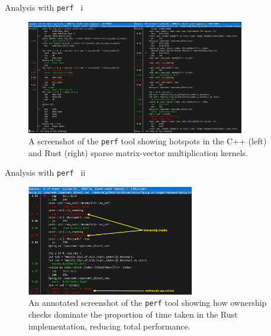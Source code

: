 \documentclass[10pt,aspectratio=169]{beamer}
\begin{document}
\begin{frame}{Analysis with \texttt{perf} \ i}
    \begin{figure}[H]
        \includegraphics[width=0.85\textwidth]{images/perf_annot_cmp.png}
        \caption{A screenshot of the \texttt{perf} tool showing hotspots in the C++ (left) and Rust (right) sparse matrix-vector multiplication kernels.}
        \label{fig:perfAnnotCmp}
    \end{figure}
\end{frame}

\begin{frame}{Analysis with \texttt{perf} \ ii}
    \begin{figure}[H]
        \includegraphics[width=0.65\textwidth]{images/perf_annot_labelled.png}
        \caption{An annotated screenshot of the \texttt{perf} tool showing how ownership checks dominate the proportion of time taken in the Rust implementation, reducing total performance.}
        \label{fig:perfAnnotLabelled}
    \end{figure}
\end{frame}

\end{document}
